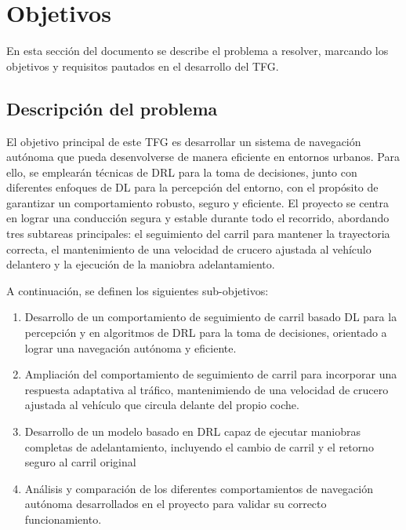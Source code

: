 \chapter{Objetivos}
\label{cap:capitulo2}

En esta sección del documento se describe el problema a resolver, marcando los objetivos y requisitos pautados en el desarrollo del \ac{TFG}.

\section{Descripción del problema}
\label{sec:descripcion}

El objetivo principal de este \ac{TFG} es desarrollar un sistema de navegación autónoma que pueda desenvolverse de manera eficiente en entornos urbanos. Para ello, se emplearán técnicas de \ac{DRL} para la toma de decisiones, junto con diferentes enfoques de \ac{DL} para la percepción del entorno, con el propósito de garantizar un comportamiento robusto, seguro y eficiente. El proyecto se centra en lograr una conducción segura y estable durante todo el recorrido, abordando tres subtareas principales: el seguimiento del carril para mantener la trayectoria correcta, el mantenimiento de una velocidad de crucero ajustada al vehículo delantero y la ejecución de la maniobra adelantamiento.

A continuación, se definen los siguientes sub-objetivos: 

\begin{enumerate}
    \item Desarrollo de un comportamiento de seguimiento de carril basado \ac{DL} para la percepción y en algoritmos de \ac{DRL} para la toma de decisiones, orientado a lograr una navegación autónoma y eficiente.
    \item Ampliación del comportamiento de seguimiento de carril para incorporar una respuesta adaptativa al tráfico, mantenimiendo de una velocidad de crucero ajustada al vehículo que circula delante del propio coche.
    \item Desarrollo de un modelo basado en \ac{DRL} capaz de ejecutar maniobras completas de adelantamiento, incluyendo el cambio de carril y el retorno seguro al carril original
    \item Análisis y comparación de los diferentes comportamientos de navegación autónoma desarrollados en el proyecto para validar su correcto funcionamiento.
\end{enumerate}

